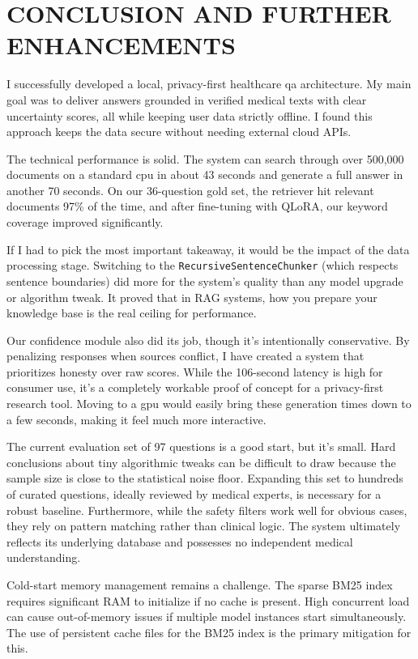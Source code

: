 \chapter{\MakeUppercase{Conclusion and Further Enhancements}}

I successfully developed a local, privacy-first healthcare \ac{qa} architecture. My main goal was to deliver answers grounded in verified medical texts with clear uncertainty scores, all while keeping user data strictly offline. I found this approach keeps the data secure without needing external cloud APIs.

The technical performance is solid. The system can search through over 500,000 documents on a standard \ac{cpu} in about 43 seconds and generate a full answer in another 70 seconds. On our 36-question gold set, the retriever hit relevant documents 97\% of the time, and after fine-tuning with QLoRA, our keyword coverage improved significantly.

If I had to pick the most important takeaway, it would be the impact of the data processing stage. Switching to the \texttt{RecursiveSentenceChunker} (which respects sentence boundaries) did more for the system’s quality than any model upgrade or algorithm tweak. It proved that in RAG systems, how you prepare your knowledge base is the real ceiling for performance.

Our confidence module also did its job, though it’s intentionally conservative. By penalizing responses when sources conflict, I have created a system that prioritizes honesty over raw scores. While the 106-second latency is high for consumer use, it’s a completely workable proof of concept for a privacy-first research tool. Moving to a \ac{gpu} would easily bring these generation times down to a few seconds, making it feel much more interactive.

The current evaluation set of 97 questions is a good start, but it's small. Hard conclusions about tiny algorithmic tweaks can be difficult to draw because the sample size is close to the statistical noise floor. Expanding this set to hundreds of curated questions, ideally reviewed by medical experts, is necessary for a robust baseline. Furthermore, while the safety filters work well for obvious cases, they rely on pattern matching rather than clinical logic. The system ultimately reflects its underlying database and possesses no independent medical understanding.

Cold-start memory management remains a challenge. The sparse BM25 index requires significant RAM to initialize if no cache is present. High concurrent load can cause out-of-memory issues if multiple model instances start simultaneously. The use of persistent cache files for the BM25 index is the primary mitigation for this.

